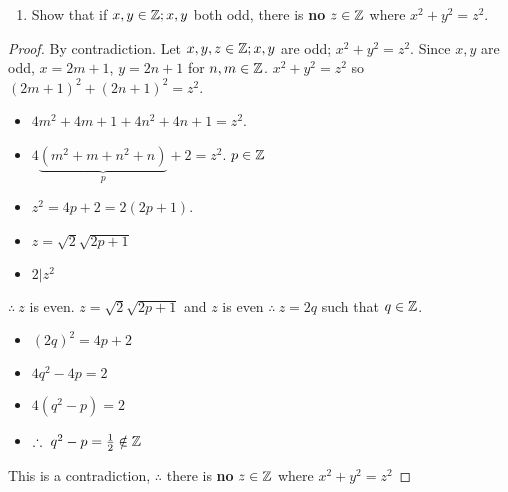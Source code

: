\begin{enumerate}
\item Show that if $x,y\in\mathbb{Z}; x,y$ both odd, there is \textbf{no} $z\in\mathbb{Z}$ where $x^2+y^2=z^2$.
\end{enumerate}
\begin{proof}
By contradiction. Let $x,y,z\in\mathbb{Z}; x,y$ are odd; $x^2+y^2=z^2$. Since $x,y$ are odd, $x=2m+1$, $y=2n+1$ for $n,m\in\mathbb{Z}$. $x^2+y^2=z^2$ so $(2m+1)^2+(2n+1)^2=z^2$. 
\begin{itemize}
\item $4m^2+4m+1+4n^2+4n+1=z^2$. 
\item $4\underbrace{(m^2+m+n^2+n)}_p+2=z^2$. $p\in\mathbb{Z}$ 
\item $z^2=4p+2=2(2p+1)$. 
\item $z=\sqrt{2}\sqrt{2p+1}$
\item $2|z^2$
\end{itemize}
$\therefore\ z$ is even. $z=\sqrt{2}\sqrt{2p+1}$ and $z$ is even $\therefore\ z=2q$ such that $q\in\mathbb{Z}$.
\begin{itemize}
\item $(2q)^2=4p+2$
\item $4q^2-4p=2$
\item $4(q^2-p)=2$
\item $\therefore\ q^2-p=\frac{1}{2}\notin\ZZ$
\end{itemize}
This is a contradiction, $\therefore$ there is \textbf{no} $z\in\mathbb{Z}$ where $x^2+y^2=z^2$
\end{proof}

